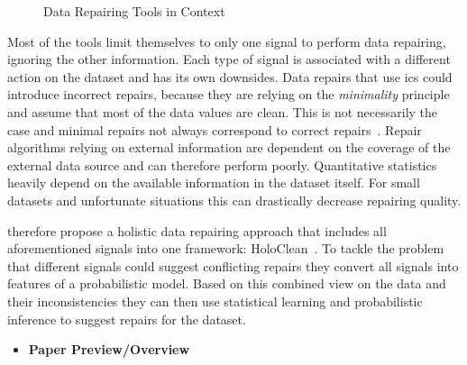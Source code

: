 \begin{figure}[hbt]

    \caption{Data Repairing Tools in Context}
    \label{fig:tools}
  \end{figure}

  \bigskip
  Most of the tools limit themselves to only one signal to perform data repairing, ignoring the other information.
  Each type of signal is associated with a different action on the dataset and has its own downsides.
  Data repairs that use \glspl{ic} could introduce incorrect repairs, because they are relying on the \textit{minimality} principle and assume that most of the data values are clean.
  This is not necessarily the case and minimal repairs not always correspond to correct repairs~\cite{holoclean}.
  Repair algorithms relying on external information are dependent on the coverage of the external data source and can therefore perform poorly.
  Quantitative statistics heavily depend on the available information in the dataset itself.
  For small datasets and unfortunate situations this can drastically decrease repairing quality.
  
  \citeauthor{holoclean} therefore propose a holistic data repairing approach that includes all aforementioned signals into one framework: HoloClean~\cite{holoclean}.
  To tackle the problem that different signals could suggest conflicting repairs they convert all signals into features of a probabilistic model.
  Based on this combined view on the data and their inconsistencies they can then use statistical learning and probabilistic inference to suggest repairs for the dataset.
  
  \begin{itemize}
    \item \textbf{Paper Preview/Overview}
  \end{itemize}


